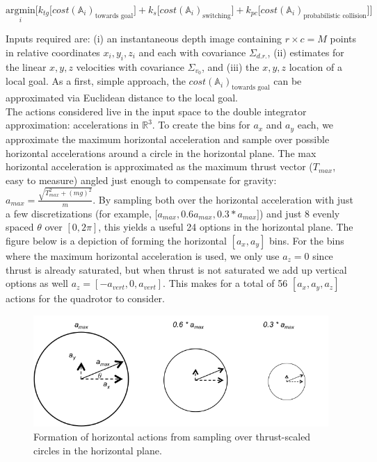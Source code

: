 \documentclass[paper=a4, fontsize=11pt]{scrartcl} %
\numberwithin{equation}{section} %
\numberwithin{figure}{section} %
\numberwithin{table}{section} %
\begin{document}
$$ \underset{i}{\text{argmin}} \bigg[ k_{tg}\big[ cost(\mathbb{A}_i)_{\text{towards goal}}  \big]+  k_{s} \big[ cost(\mathbb{A}_i)_{\text{switching}} \big]+   k_{pc}\big[ cost(\mathbb{A}_i)_{\text{probabilistic collision}} \big]  \bigg]$$


Inputs required are: (i) an instantaneous depth image containing $r \times c = M$ points in relative coordinates $x_i, y_i, z_i$ and each with covariance $\Sigma_{d.r.}$, (ii) estimates for the linear $x, y, z$ velocities with covariance $\Sigma_{v_0}$, and (iii) the $x,y,z$ location of a local goal.  As a first, simple approach, the $cost(\mathbb{A}_i)_{\text{towards goal}} $ can be approximated via Euclidean distance to the local goal.\\

The actions considered live in the input space to the double integrator approximation: accelerations in $\mathbb{R}^3$.  To create the bins for $a_x$ and $a_y$ each, we approximate the maximum horizontal acceleration and sample over possible horizontal accelerations around a circle in the horizontal plane.   The max horizontal acceleration is approximated as the maximum thrust vector ($T_{max}$, easy to measure) angled just enough to compensate for gravity: $a_{max} = \frac{ \sqrt{ T_{max}^2 + (mg)^2}}{m}$.  By sampling both over the horizontal acceleration with just a few discretizations (for example, [$a_{max}, 0.6a_{max}, 0.3*a_{max} ]$) and just 8 evenly spaced $\theta$ over $[0, 2\pi]$, this yields a useful 24 options in the horizontal plane.  The figure below is a depiction of forming the horizontal $[a_x, a_y]$ bins.  For the bins where the maximum horizontal acceleration is used, we only use $a_z = 0$ since thrust is already saturated, but when thrust is not saturated we add up vertical options as well $a_z = [-a_{vert}, 0, a_{vert}]$. This makes for a total of 56 $[a_x, a_y, a_z]$ actions for the quadrotor to consider.\\

\begin{figure}
  \includegraphics[width=\linewidth]{horizontal_actions.png}
  \caption{Formation of horizontal actions from sampling over thrust-scaled circles in the horizontal plane.}
  \label{fig:boat1}
\end{figure}
\end{document}
